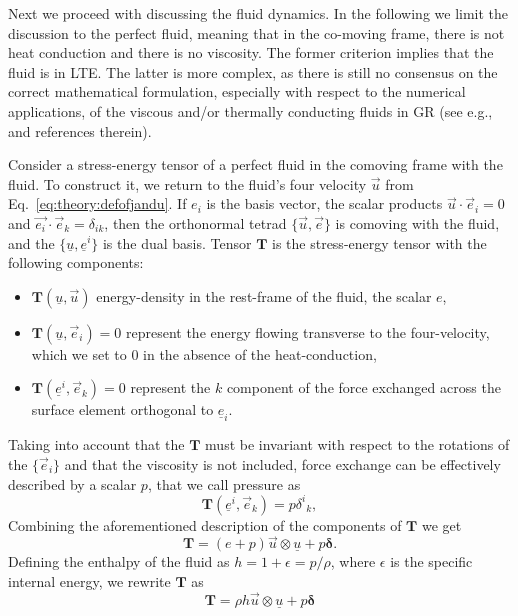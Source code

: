 

Next we proceed with discussing the fluid dynamics. 
%
In the following we limit the discussion to the perfect fluid, meaning that in the co-moving frame, 
there is not heat conduction and there is no viscosity. The former criterion implies that the fluid is in 
\ac{LTE}. The latter is more complex, as there is still no consensus on the correct mathematical formulation, 
especially with respect to the numerical applications, of the viscous and/or thermally conducting fluids in 
\ac{GR} (see e.g., \citet{Andersson:2006nr} and references therein). 


Consider a stress-energy tensor of a perfect fluid in the comoving frame with the fluid. 
To construct it, we return to the fluid's four velocity $\vec{u}$ from Eq.~\eqref{eq:theory:defofjandu}. 
If $e_{i}$ is the basis vector, the scalar products $\vec{u}\cdot\vec{e}_i=0$ and 
$\vec{e_i}\cdot\vec{e}_k = \delta_{ik}$, then the orthonormal tetrad 
$\{\vec{u},\vec{e}\}$ is comoving with the fluid, and the $\{\underline{u},\underline{e}^i\}$ is the dual basis. 
%
Tensor $\boldsymbol{T}$ is the stress-energy tensor with the following components: 
%
\begin{itemize}
    \item $\boldsymbol{T}(\underline{u}, \vec{u})$ energy-density in the rest-frame of the fluid, the scalar $e$,
    \item $\boldsymbol{T}(\underline{u}, \vec{e}_i) = 0$ represent the energy 
    flowing transverse to the four-velocity, which we set to $0$ in the absence of the heat-conduction,
    \item $\boldsymbol{T}(\underline{e}^i, \vec{e}_k) = 0$ represent the $k$ component 
    of the force exchanged across the surface element orthogonal to $\underline{e}_i$.
\end{itemize}
%
Taking into account that the $\boldsymbol{T}$ must be invariant with respect to the rotations 
of the $\{\vec{e}_i\}$ and that the viscosity is not included, force exchange can be effectively described 
by a scalar $p$, that we call pressure as
%
\begin{equation}
\boldsymbol{T}(\underline{e}^i,\vec{e}_k) = p {\delta^i}_k,
\end{equation}
%
Combining the aforementioned description of the components of $\boldsymbol{T}$ we get
%
\begin{equation}
\boldsymbol{T} = (e + p)\vec{u}\otimes \underline{u} + p\boldsymbol{\delta}.
\end{equation}
%
Defining the enthalpy of the fluid as $h = 1 + \epsilon = p/\rho$, where $\epsilon$ is the specific internal energy, 
we rewrite $\boldsymbol{T}$ as 
%
\begin{equation}
\boldsymbol{T} = \rho h \vec{u}\otimes\underline{u} + p\boldsymbol{\delta}
\label{eq:theory:stressenergytensor}
\end{equation}


